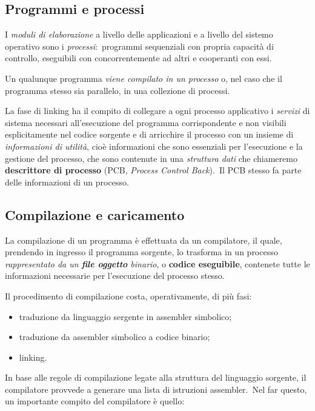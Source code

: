 \subsection{Programmi e processi}

I \textit{moduli di elaborazione} a livello delle applicazioni e a livello del sistemo operativo sono i \textit{processi}:\ programmi sequenziali con propria capacità di controllo, eseguibili con concorrentemente ad altri e cooperanti con essi.

Un qualunque programma \textit{viene compilato in un processo} o, nel caso che il programma stesso sia parallelo, in una collezione di processi.

La fase di linking ha il compito di collegare a ogni processo applicativo i \textit{servizi} di sistema necessari all'esecuzione del programma corrispondente e non visibili esplicitamente nel codice sorgente e di arricchire il processo con un insieme di \textit{informazioni di utilità}, cioè informazioni che sono essenziali per l'esecuzione e la gestione del processo, che sono contenute in una \textit{struttura dati} che chiameremo \textbf{descrittore di processo} (PCB, \textit{Process Control Back}).\
Il PCB stesso fa parte delle informazioni di un processo.

\subsection{Compilazione e caricamento}

La compilazione di un programma è effettuata da un compilatore, il quale, prendendo in ingresso il programma sorgente, lo trasforma in un processo \textit{rappresentato da un \textbf{file oggetto} binario}, o \textbf{codice eseguibile}, contenete tutte le informazioni necessarie per l'esecuzione del processo stesso.

Il procedimento di compilazione costa, operativamente, di più fasi:

\begin{itemize}
    \item traduzione da linguaggio sergente in assembler simbolico;
    \item traduzione da assembler simbolico a codice binario;
    \item linking.
\end{itemize}

\noindent In base alle regole di compilazione legate alla struttura del linguaggio sorgente, il compilatore provvede a generare una lista di istruzioni assembler.\
Nel far questo, un importante compito del compilatore è quello:


